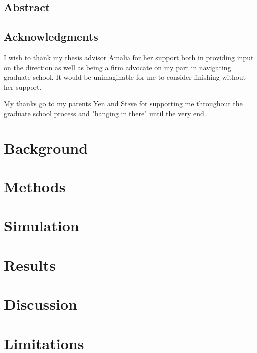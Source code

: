 

\frontmatter

\thetitlepage
\cleardoublepage
\setcounter{page}{1}

\section{Abstract}
\uwabstract
\cleardoublepage

\section{Acknowledgments}
I wish to thank my thesis advisor Amalia for her support both in providing input on the direction as well as being a firm advocate on my part in navigating graduate school. It would be unimaginable for me to consider finishing without her support.

My thanks go to my parents Yen and Steve for supporting me throughout the graduate school process and "hanging in there" until the very end. 

\clearpage

\tableofcontents\clearpage
\listoffigures\clearpage
\listoftables\clearpage

\mainmatter

\chapter{Background}

\chapter{Methods}

\chapter{Simulation}

\chapter{Results}

\chapter{Discussion}

\chapter{Limitations}





